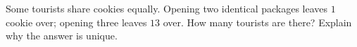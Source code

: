 Some tourists share cookies equally. Opening two identical packages leaves $1$ cookie over; opening three leaves $13$ over. How many tourists are there? Explain why the answer is unique.
